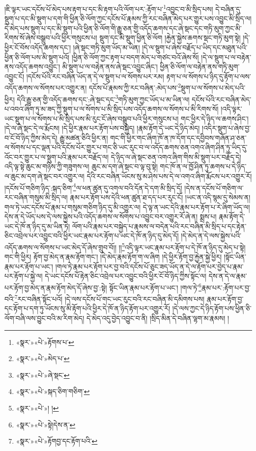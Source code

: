 །ཇི་ལྟར་ཡང་དངོས་པོ་མེད་པས་རྟག་པ་དང་མི་རྟག་པའི་ལོག་པར་:རྟོག་པ་\footnote{«སྣར་»«པེ་»རྟོགས་པ་}འབྱུང་བ་མི་སྲིད་པས། དེ་བཞིན་དུ་སྡུག་པ་དང་མི་སྡུག་པ་དག་གི་ཕྱིན་ཅི་ལོག་ཀྱང་དངོས་པོ་རྣམས་ཀྱི་རང་བཞིན་མེད་པར་གྱུར་པས་འབྱུང་མི་སྲིད་ལ། དེ་མེད་པས་སྡུག་པ་དང་མི་སྡུག་པའི་ཕྱིན་ཅི་ལོག་གི་རྒྱུ་ཅན་གྱི་འདོད་ཆགས་དང་ཞེ་སྡང་དང་གཏི་མུག་ཀྱང་མི་རིགས་སོ་ཞེས་བསྒྲུབ་པའི་ཕྱིར་གསུངས་པ། སྡུག་དང་མི་སྡུག་ཕྱིན་ཅི་ལོག །རྐྱེན་སྐྱེས་ཆགས་སྡང་གཏི་མུག་སྟེ། །དེ་ཕྱིར་ངོ་བོས་འདོད་ཆགས་དང་། །ཞེ་སྡང་གཏི་མུག་ཡོད་མ་ཡིན། །དེ་ལ་སྡུག་པ་ཞེས་བརྗོད་པ་ཡིད་དང་མཐུན་པའི་ཕྱིན་ཅི་ལོག་པས་མི་སྡུག་པའོ། །ཕྱིན་ཅི་ལོག་ཀྱང་རྟག་པ་བདག་མེད་པ་གཙང་བའོ་ཞེས་སོ། །དེ་ལ་སྡུག་པ་ལ་བརྟེན་ནས་འདོད་ཆགས་འབྱུང་། མི་སྡུག་པ་ལ་བརྟེན་ནས་ཞེ་སྡང་འབྱུང་ཞིང་། ཕྱིན་ཅི་ལོག་ལ་བརྟེན་ནས་གཏི་མུག་འབྱུང་ངོ། །དངོས་པོའི་རང་བཞིན་ཡོད་ན་དེ་ལ་སྡུག་པ་ལ་སོགས་པར་རམ། རྟག་པ་ལ་སོགས་པ་ཉིད་དུ་རྟོག་པ་ལས་འདོད་ཆགས་ལ་སོགས་པར་འགྱུར་ན། དངོས་པོ་རྣམས་ཀྱི་རང་བཞིན་:མེད་པས་\footnote{«སྣར་»«པེ་»མེད་པ་}སྡུག་པ་ལ་སོགས་པ་མེད་པའི་ཕྱིར། དེའི་རྒྱུ་ཅན་གྱི་འདོད་ཆགས་དང་:ཞེ་སྡང་དང་\footnote{«སྣར་»«པེ་»ཞེ་སྡང་}གཏི་མུག་ཀྱང་ཡོད་པ་མ་ཡིན་ལ། དངོས་པོའི་རང་བཞིན་མེད་པ་འབའ་ཞིག་ཏུ་མ་ཟད་ཀྱི་སྡུག་པ་ལ་སོགས་པ་མི་སྲིད་པས་འདོད་ཆགས་ལ་སོགས་པ་མི་རིགས་སོ། །འདི་ལྟར་ཡང་སྡུག་པ་ལ་སོགས་པ་མི་སྲིད་པས་མི་རུང་ངོ་ཞེས་བསྒྲུབ་པའི་ཕྱིར་གསུངས་པ། གང་ཕྱིར་དེ་ཉིད་ལ་ཆགས་ཤིང་། །དེ་ལ་ཞེ་སྡང་དེ་ལ་རྨོངས། །དེ་ཕྱིར་རྣམ་པར་རྟོག་པས་བསྐྱེད། །རྣམ་རྟོག་དེ་ཡང་དེ་ཉིད་མེད། །འདིར་སྡུག་པ་ཞེས་བྱ་བ་ངོ་བོ་ཉིད་ཀྱིས་མེད་དེ། རྒྱུ་མཚན་ཅིའི་ཕྱིར་ན། གང་གི་ཕྱིར་གང་ཞིག་ཁོ་ན་ཁ་དོག་དང་དབྱིབས་གཞོན་ཤ་ཅན་ལ་སོགས་པ་དང་ལྡན་པའི་དངོས་པོར་གྱུར་པ་གང་ཅི་ཡང་རུང་བ་ལ་འདོད་ཆགས་ཅན་འགའ་ཞིག་ཤིན་ཏུ་ཡིད་དུ་འོང་བར་གྱུར་པ་ལ་སྡུག་པའི་རྣམ་པར་བརྗོད་ལ། དེ་ཉིད་ལ་ཞེ་སྡང་ཅན་འགའ་ཞིག་གིས་མི་སྡུག་པར་བརྗོད་དེ། འདི་ལྟ་སྟེ་ཆུང་མ་གཉིས་ཀྱི་གཟུགས་ལ། ཆུང་མ་དག་ཞེ་སྡང་བ་ལྟ་བུ་སྟེ། གང་ཁོ་ན་ལ་ཁྱོ་ཤིན་ཏུ་ཆགས་པ་དེ་ཉིད་ལ་ཆུང་མ་དག་ཞེ་སྡང་བར་འགྱུར་ལ། དེའི་རང་བཞིན་ཡོངས་སུ་མ་ཤེས་པས་དེ་ལ་འགའ་ཞིག་རྨོངས་པར་འགྱུར་རོ། །དངོས་པོ་གཅིག་ཉིད་:སྐད་ཅིག་\footnote{«སྣར་»«པེ་»སྐད་ཅིག་གཅིག་}ལ་ཕན་ཚུན་དུ་འགལ་བའི་དོན་དེ་དག་མི་སྲིད་དོ། །དེས་ན་དངོས་པོ་གཅིག་ལ་རང་བཞིན་གསུམ་མི་སྲིད་ལ། རྣམ་པར་རྟོག་པས་དེའི་ཕན་ཚུན་ཐ་དད་པར་རུང་ངོ། །ཡང་ན་འདི་སྙམ་དུ་སེམས་ན། གལ་ཏེ་ཡང་དངོས་པོ་རྣམ་པ་གསུམ་གཅིག་ཉིད་དུ་མི་འགྱུར་ལ། དེ་ལྟ་ན་ཡང་དེའི་རྣམ་པར་རྟོག་པ་རེ་ཞིག་ཡོད་ལ། དེས་ན་དེ་ཡོད་པས་དེ་ལས་སྐྱེས་པའི་འདོད་ཆགས་ལ་སོགས་པ་འབྱུང་བར་འགྱུར་རོ་ཞེ་ན། སྨྲས་པ། རྣམ་རྟོག་དེ་ཡང་དེ་ཁོ་ན་ཉིད་དུ་མ་ཡིན་ཏེ། ལོག་པའི་རྣམ་པར་བསྐྱེད་པ་རྣམས་ལ་བདེན་པའི་རང་བཞིན་མི་སྲིད་པ་དང་རྟེན་ཅིང་འབྲེལ་པར་འབྱུང་བའི་ཕྱིར་ཡང་རྣམ་པར་རྟོག་པ་ཡང་དེ་ཁོ་ན་ཉིད་དུ་མེད་དོ། །དེ་མེད་ན་དེ་ལས་སྐྱེས་པའི་འདོད་ཆགས་ལ་སོགས་པ་ཡང་མེད་དོ་ཞེས་གྲུབ་བོ།། །།\footnote{«སྣར་»«པེ་»། །}འདི་ལྟར་ཡང་རྣམ་པར་རྟོག་པ་དེ་ཁོ་ན་ཉིད་དུ་མེད་པ་སྟེ། གང་གི་ཕྱིར། རྟོག་བྱ་མེད་ན་རྣམ་རྟོག་གང་། །དེ་མེད་རྣམ་རྟོག་ག་ལ་ཞིག །དེ་ཕྱིར་རྟོག་བྱ་རྐྱེན་སྐྱེ་ཕྱིར། །སྟོང་ཡིན་རྣམ་པར་རྟོག་པ་ཡང་། །གལ་ཏེ་རྣམ་པར་རྟོག་པར་བྱ་བའི་དངོས་པོ་ཅུང་ཟད་ཡོད་ན་དེ་ལ་རྟོག་པར་བྱེད་པ་རྣམ་པར་རྟོག་པ་སྐྱེ་ལ། དེ་ཡང་དངོས་པོ་རྟེན་ཅིང་འབྲེལ་པར་འབྱུང་བའི་ཕྱིར་ངོ་བོ་ཉིད་ཀྱིས་སྟོང་ལ། དེས་ན་དེ་ལ་རྣམ་པར་རྟོག་བྱ་མེད་ན་རྣམ་རྟོག་མེད་དོ་ཞེས་བྱ་:སྟེ། སྟོང་ཡིན་རྣམ་པར་རྟོག་པ་ཡང་། །གལ་ཏེ་\footnote{«སྣར་»«པེ་»སྟེ།དེས་ན་}རྣམ་པར་:རྟོག་པར་བྱ་བའི་\footnote{«སྣར་»«པེ་»རྟོགབྱ་དང་རྟོག་པའི་}རང་བཞིན་སྟོང་པའོ། །དེ་ལས་དངོས་པོ་གང་ཡང་རུང་བའི་རང་བཞིན་མི་དམིགས་པས། རྣམ་པར་རྟོག་བྱ་དང་རྟོག་པ་དག་ཏུ་ཡོངས་སུ་མི་རྟོག་པའི་ཕྱིར་དེ་ཁོ་ན་ཉིད་རྟོག་པར་འགྱུར་རོ། །དེ་ལས་ཀྱང་དེ་ཉིད་རྟོག་པས་ཕྱིན་ཅི་ལོག་བཞི་ལས་བྱུང་བའི་མ་རིག་མེད། དེ་མེད་འདུ་བྱེད་འབྱུང་བ་ནི། །སྲིད་མིན་དེ་བཞིན་ལྷག་མ་རྣམས། །

